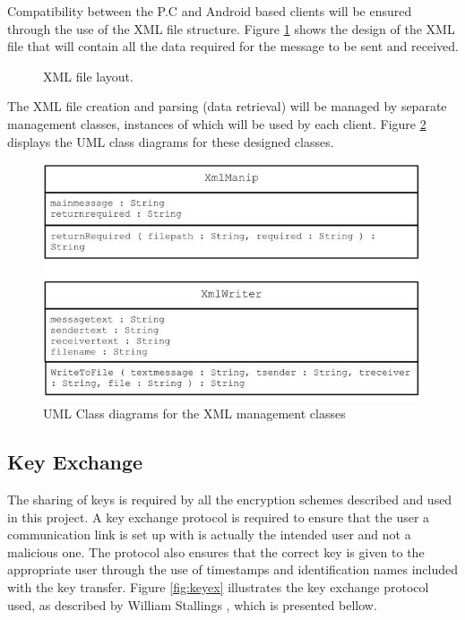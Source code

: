 \documentclass[a4paper,10pt]{report}
\begin{document}
Compatibility between the P.C and Android based clients will be ensured through the use of the XML file structure. Figure \ref{fig:xmldesign} shows the design of the XML file that will contain all the data required for the message to be sent and received.  

\begin{figure}[htb]
\centering

\caption{XML file layout.}
\label{fig:xmldesign}
\end{figure}

The XML file creation and parsing (data retrieval) will be managed by separate management classes, instances of which will be used by each client. Figure \ref{fig:xmlclass} displays the UML class diagrams for these designed classes.

\begin{figure}[htb]
\centering
\includegraphics[scale=0.4]{images/xmlclass.jpg}
\caption{UML Class diagrams for the XML management classes}
\label{fig:xmlclass}
\end{figure}

\subsection{Key Exchange}

The sharing of keys is required by all the encryption schemes described and used in this project. A key exchange protocol is required to ensure that the user a communication link is set up with is actually the intended user and not a malicious one. The protocol also ensures that the correct key is given to the appropriate user through the use of timestamps and identification names included with the key transfer. Figure \ref{fig:keyex} illustrates the key exchange protocol used, as described by William Stallings \cite{willstallings}, which is presented bellow.
\end{document}
